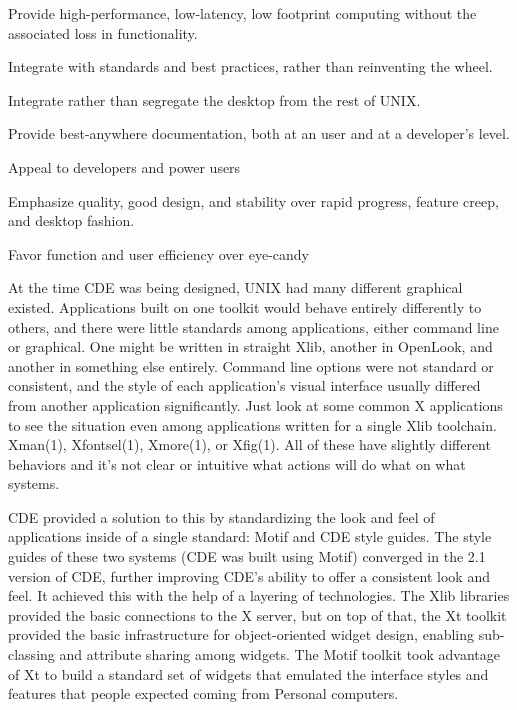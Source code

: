\li Provide high-performance, low-latency, low footprint computing
without the associated loss in functionality.

\li Integrate with standards and best practices, rather than reinventing
the wheel.

\li Integrate rather than segregate the desktop from the rest of UNIX.

\li Provide best-anywhere documentation, both at an user and at a
developer’s level. 

\li Appeal to developers and power users 

\li Emphasize quality, good design, and stability over rapid progress,
feature creep, and desktop fashion.

\li Favor function and user efficiency over eye-candy

\endnumberedlist


At the time CDE was being designed, UNIX had many different
graphical existed. Applications built on one toolkit would behave 
entirely differently to others, and there were little standards among
applications, either command line or graphical. One might be written in
straight Xlib, another in OpenLook, and another in something else
entirely. Command line options were not standard or consistent, and the
style of each application’s visual interface usually differed from
another application significantly. Just look at some common X
applications to see the situation even among applications written for a
single Xlib toolchain. Xman(1), Xfontsel(1), Xmore(1), or Xfig(1). All
of these have slightly different behaviors and it’s not clear or
intuitive what actions will do what on what systems.

CDE provided a solution to this by standardizing the look and feel of
applications inside of a single standard: Motif and CDE style guides.
The style guides of these two systems (CDE was built using Motif)
converged in the 2.1 version of CDE, further improving CDE’s ability to
offer a consistent look and feel. It achieved this with the help of a
layering of technologies. The Xlib libraries provided the basic
connections to the X server, but on top of that, the Xt toolkit provided
the basic infrastructure for object-oriented widget design, enabling
sub-classing and attribute sharing among widgets. The Motif toolkit took
advantage of Xt to build a standard set of widgets that emulated the
interface styles and features that people expected coming from Personal
computers. 

